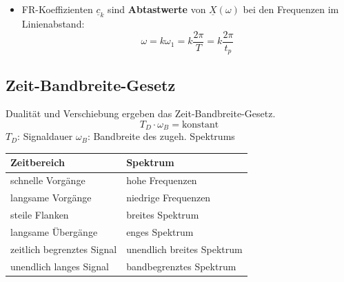 \begin{multicols*}{2}
\begin{itemize}
	\item FR-Koeffizienten $\underline{c}_k $ sind
	\textbf{Abtastwerte} von $\underline{X}(\omega)$ bei den Frequenzen im Linienabstand:
	\[\omega=k\omega_1=k\frac{2\pi}{T}=k\frac{2\pi}{t_p}\]
\end{itemize}
 \columnbreak
\subsection{Zeit-Bandbreite-Gesetz}
Dualität und Verschiebung ergeben das Zeit-Bandbreite-Gesetz.\\
$$T_D \cdot \omega_B = \text{konstant}$$
$T_D$: Signaldauer \quad $\omega_B$: Bandbreite des zugeh. Spektrums\\
\setlength{\parindent}{0pt}

\small
\begin{tabularx}{\columnwidth}{|X|X|}
	\hline
	Zeitbereich & Spektrum \\
	\hline
	schnelle Vorgänge & hohe Frequenzen\\
	\hline
	langsame Vorgänge & niedrige Frequenzen\\
	\hline
	steile Flanken & breites Spektrum\\
	\hline
	langsame Übergänge & enges Spektrum\\
	\hline
	zeitlich begrenztes Signal & unendlich breites Spektrum\\
	\hline
	unendlich langes Signal & bandbegrenztes Spektrum\\
	\hline
\end{tabularx}
\normalsize

\end{multicols*}
